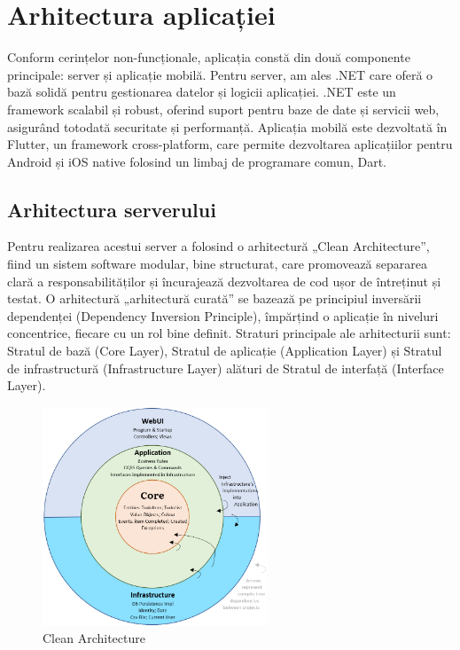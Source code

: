 \chapter{Arhitectura aplicației}

Conform cerințelor non-funcționale, aplicația constă din două componente principale: server și aplicație mobilă. Pentru server, am ales .NET care oferă o bază solidă pentru gestionarea datelor și logicii aplicației. .NET este un framework scalabil și robust, oferind suport pentru baze de date și servicii web, asigurând totodată securitate și performanță. Aplicația mobilă este dezvoltată în Flutter, un framework cross-platform, care permite dezvoltarea aplicațiilor pentru Android și iOS native folosind un limbaj de programare comun, Dart.

\section{Arhitectura serverului}

Pentru realizarea acestui server a folosind o arhitectură „Clean Architecture”, fiind un sistem software modular, bine structurat, care promovează separarea clară a responsabilităților și încurajează dezvoltarea de cod ușor de întreținut și testat.
O arhitectură „arhitectură curată” se bazează pe principiul inversării dependenței (Dependency Inversion Principle), împărțind o aplicație în niveluri concentrice, fiecare cu un rol bine definit. Straturi principale ale arhitecturii sunt: Stratul de bază (Core Layer), Stratul de aplicație (Application Layer) și Stratul de infrastructură (Infrastructure Layer) alături de Stratul de interfață (Interface Layer).

\begin{figure}[ht]
    \centering
    \includegraphics[width=0.6\textwidth] {images/clean_architecture.png}
    \caption{Clean Architecture{\cite{clean_architecture}}}
    \label{fig:clean_architecture}
\end{figure}

